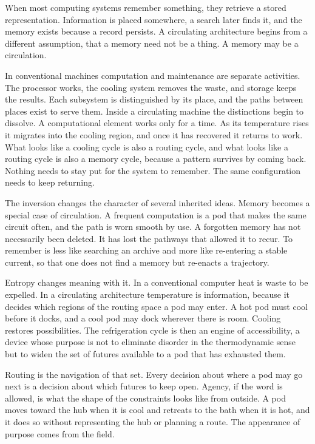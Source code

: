 \documentclass[11pt,openany]{book}
\theoremstyle{plain}
\theoremstyle{definition}
\theoremstyle{remark}
\begin{document}
When most computing systems remember something, they retrieve a stored representation. Information is placed somewhere, a search later finds it, and the memory exists because a record persists. A circulating architecture begins from a different assumption, that a memory need not be a thing. A memory may be a circulation.

In conventional machines computation and maintenance are separate activities. The processor works, the cooling system removes the waste, and storage keeps the results. Each subsystem is distinguished by its place, and the paths between places exist to serve them. Inside a circulating machine the distinctions begin to dissolve. A computational element works only for a time. As its temperature rises it migrates into the cooling region, and once it has recovered it returns to work. What looks like a cooling cycle is also a routing cycle, and what looks like a routing cycle is also a memory cycle, because a pattern survives by coming back. Nothing needs to stay put for the system to remember. The same configuration needs to keep returning.

The inversion changes the character of several inherited ideas. Memory becomes a special case of circulation. A frequent computation is a pod that makes the same circuit often, and the path is worn smooth by use. A forgotten memory has not necessarily been deleted. It has lost the pathways that allowed it to recur. To remember is less like searching an archive and more like re-entering a stable current, so that one does not find a memory but re-enacts a trajectory.

Entropy changes meaning with it. In a conventional computer heat is waste to be expelled. In a circulating architecture temperature is information, because it decides which regions of the routing space a pod may enter. A hot pod must cool before it docks, and a cool pod may dock wherever there is room. Cooling restores possibilities. The refrigeration cycle is then an engine of accessibility, a device whose purpose is not to eliminate disorder in the thermodynamic sense but to widen the set of futures available to a pod that has exhausted them.

Routing is the navigation of that set. Every decision about where a pod may go next is a decision about which futures to keep open. Agency, if the word is allowed, is what the shape of the constraints looks like from outside. A pod moves toward the hub when it is cool and retreats to the bath when it is hot, and it does so without representing the hub or planning a route. The appearance of purpose comes from the field.
\end{document}
